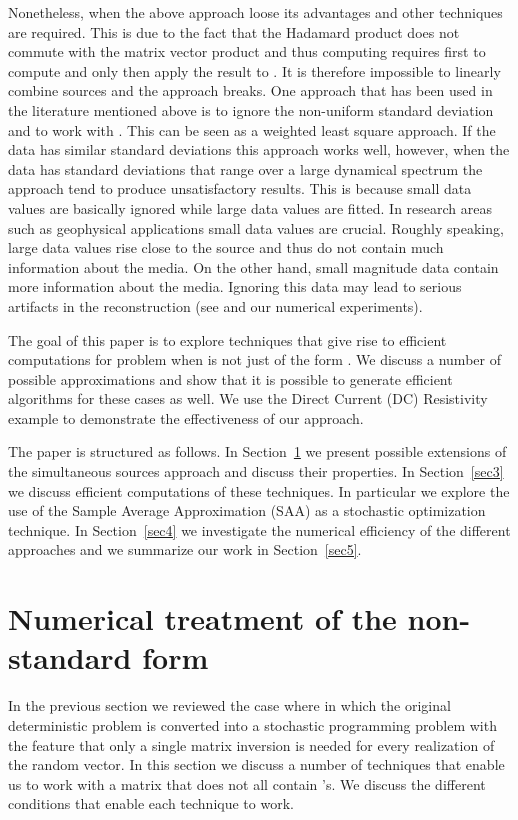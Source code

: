 \documentclass[12pt]{article}
\begin{document}
Nonetheless, when  the above approach loose its advantages and other techniques are required. This is due to the fact that the Hadamard product does not commute with the matrix vector product and thus computing  requires first to compute  and only then apply the result to . It is therefore impossible to linearly combine sources and the approach  breaks. One approach that has been used in the literature mentioned above is to ignore the non-uniform standard deviation and to work with . This can be seen as a weighted least square approach. If the data has similar standard deviations this approach works well, however, when the data has standard deviations that range over a large dynamical spectrum the approach tend to produce unsatisfactory results. This is because small data values are basically ignored while large data values are fitted. In research areas such as geophysical applications small data values are crucial. Roughly speaking, large data values rise close to the source and thus do not contain much information about the media. On the other hand, small magnitude data contain more information about the media. Ignoring  this data may lead to serious artifacts in the reconstruction (see \cite{parker,taran} and our numerical experiments).

The goal of this paper is to explore techniques that give rise to efficient computations for problem when  is not just of the form . We discuss a number of possible approximations and show that it is possible to generate efficient algorithms for these cases as well. We use the Direct Current (DC) Resistivity example to demonstrate the effectiveness of our approach.

The paper is structured as follows. In Section~\ref{sec2} we present possible extensions of the simultaneous sources approach and discuss their properties. In Section~\ref{sec3} we discuss efficient computations of these techniques. In particular we explore the use of the Sample Average Approximation (SAA) as a stochastic optimization technique. In Section~\ref{sec4} we investigate the numerical efficiency of the different approaches and we summarize our work in Section~\ref{sec5}.

\section{Numerical treatment of the non-standard form}
\label{sec2}

In the previous section we reviewed the case where  in which the original deterministic problem is converted into a stochastic programming problem with the feature that only a single matrix inversion is needed for every realization of the random vector. In this section we discuss a number of techniques that enable us to work with a matrix  that does not all contain 's. We discuss the different conditions that enable each technique to work.
\end{document}
